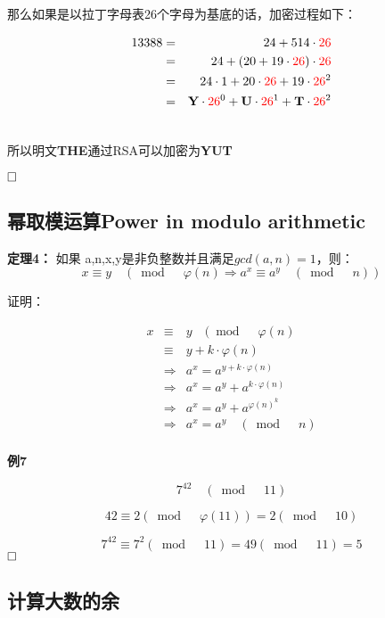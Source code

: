 \documentclass{article}
\begin{document}
那么如果是以拉丁字母表26个字母为基底的话，加密过程如下：

\begin{eqnarray}   
\label{eq}
13388&=& 24 + 514 \cdot {\color{red}26}   \nonumber \\ 
&=&  24 + (20 + 19 \cdot {\color{red}26} ) \cdot {\color{red}26}  \nonumber \\ 
&=& 24 \cdot 1 + 20 \cdot {\color{red}26} + 19 \cdot {\color{red}26}^2  \nonumber \\ 
&=& \textbf{Y}\cdot {\color{red}26}^0 + \textbf{U}\cdot {\color{red}26}^1 + \textbf{T}\cdot {\color{red}26}^2 \nonumber \\ 
\nonumber 
\end{eqnarray}

所以明文\textbf{THE}通过RSA可以加密为\textbf{YUT}

$\hfill\square$ 

\subsection{幂取模运算Power in modulo arithmetic}

\textbf{定理4：} 如果 a,n,x,y是非负整数并且满足$gcd(a,n) = 1$，则：
$$x \equiv y \quad (\bmod \quad \varphi(n) \Rightarrow a^x \equiv a^y \quad (\bmod \quad n))$$

证明：


\begin{eqnarray}   
\label{eq}
x &\equiv& y \quad (\bmod \quad \varphi(n)  \nonumber \\ 
&\equiv& y + k \cdot  \varphi(n) \nonumber \\ 
&\Rightarrow& a^x = a^{y + k \cdot  \varphi(n)} \nonumber \\ 
&\Rightarrow& a^x = a^{y} + a^{k \cdot  \varphi(n)} \nonumber \\ 
&\Rightarrow& a^x = a^{y} + a^{\varphi(n)}^k \nonumber \\ 
&\Rightarrow& a^x = a^{y} \quad (\bmod \quad n) \nonumber \\ 
\nonumber 
\end{eqnarray}

\textbf{例7}

$$7^{42} \quad (\bmod \quad 11)$$

$$42 \equiv 2  (\bmod \quad \varphi(11)) = 2  (\bmod \quad 10)$$

$$7^{42} \equiv 7^2  (\bmod \quad 11) = 49 (\bmod \quad 11) = 5$$
$\hfill\square$ 

\subsection{计算大数的余}
\end{document}
